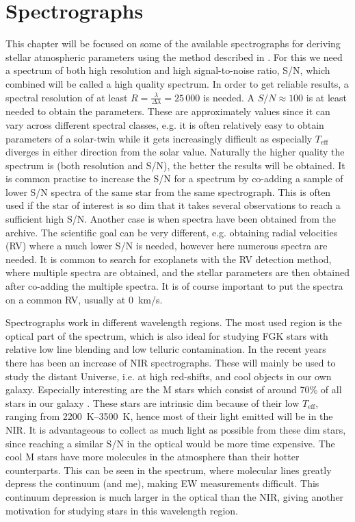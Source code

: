 \chapter{Spectrographs}
\label{cha:spectrographs}

This chapter will be focused on some of the available spectrographs for deriving
stellar atmospheric parameters using the method described in
. For this we need a spectrum of both high resolution and
high signal-to-noise ratio, S/N, which combined will be called a high quality
spectrum. In order to get reliable results, a spectral resolution of at least
$R=\frac{\lambda}{\Delta\lambda}=25\,000$ is needed. A $S/N\approx 100$ is at
least needed to obtain the parameters. These are approximately values since it
can vary across different spectral classes, e.g. it is often relatively easy to
obtain parameters of a solar-twin while it gets increasingly difficult as
especially $T_\mathrm{eff}$ diverges in either direction from the solar value.
Naturally the higher quality the spectrum is (both resolution and S/N), the
better the results will be obtained. It is common practise to increase the S/N
for a spectrum by co-adding a sample of lower S/N spectra of the same star from
the same spectrograph. This is often used if the star of interest is so dim that
it takes several observations to reach a sufficient high S/N. Another case is
when spectra have been obtained from the archive. The scientific goal can be
very different, e.g. obtaining radial velocities (RV) where a much lower S/N is
needed, however here numerous spectra are needed. It is common to search for
exoplanets with the RV detection method, where multiple spectra are obtained,
and the stellar parameters are then obtained after co-adding the multiple
spectra. It is of course important to put the spectra on a common RV, usually at
\SI{0}{km/s}.

Spectrographs work in different wavelength regions. The most used region is the
optical part of the spectrum, which is also ideal for studying FGK stars with
relative low line blending and low telluric contamination. In the recent years
there has been an increase of NIR spectrographs. These will mainly be used to
study the distant Universe, i.e. at high red-shifts, and cool objects in our own
galaxy. Especially interesting are the M stars which consist of around 70\% of
all stars in our galaxy \citep{Bochanski2010}. These stars are intrinsic dim
because of their low $T_\mathrm{eff}$, ranging from \SIrange{2200}{3500}{K},
hence most of their light emitted will be in the NIR. It is advantageous to
collect as much light as possible from these dim stars, since reaching a similar
S/N in the optical would be more time expensive. The cool M stars have more
molecules in the atmosphere than their hotter counterparts. This can be seen in
the spectrum, where molecular lines greatly depress the continuum (and
me), making EW measurements difficult. This
continuum depression is much larger in the optical than the NIR, giving another
motivation for studying stars in this wavelength region.
